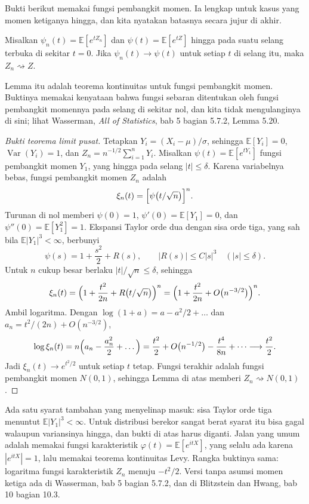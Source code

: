 Bukti berikut memakai fungsi pembangkit momen. Ia lengkap untuk kasus yang momen
ketiganya hingga, dan kita nyatakan batasnya secara jujur di akhir.

\begin{lemma}
Misalkan $\psi_n(t)=\mathbb{E}[e^{tZ_n}]$ dan $\psi(t)=\mathbb{E}[e^{tZ}]$ hingga
pada suatu selang terbuka di sekitar $t=0$. Jika $\psi_n(t)\to\psi(t)$ untuk
setiap $t$ di selang itu, maka $Z_n\rightsquigarrow Z$.
\end{lemma}

Lemma itu adalah teorema kontinuitas untuk fungsi pembangkit momen. Buktinya
memakai kenyataan bahwa fungsi sebaran ditentukan oleh fungsi pembangkit momennya
pada selang di sekitar nol, dan kita tidak mengulanginya di sini; lihat Wasserman,
\emph{All of Statistics}, bab 5 bagian 5.7.2, Lemma 5.20.

\begin{proof}[Bukti teorema limit pusat]
Tetapkan $Y_i=(X_i-\mu)/\sigma$, sehingga $\mathbb{E}[Y_i]=0$,
$\operatorname{Var}(Y_i)=1$, dan $Z_n=n^{-1/2}\sum_{i=1}^n Y_i$. Misalkan
$\psi(t)=\mathbb{E}[e^{tY_1}]$ fungsi pembangkit momen $Y_1$, yang hingga pada
selang $|t|\le\delta$. Karena variabelnya bebas, fungsi pembangkit momen $Z_n$
adalah
\[
\xi_n(t)=\Bigl[\psi\bigl(t/\sqrt n\bigr)\Bigr]^n .
\]
Turunan di nol memberi $\psi(0)=1$, $\psi'(0)=\mathbb{E}[Y_1]=0$, dan
$\psi''(0)=\mathbb{E}[Y_1^2]=1$. Ekspansi Taylor orde dua dengan sisa orde tiga,
yang sah bila $\mathbb{E}|Y_1|^3<\infty$, berbunyi
\[
\psi(s)=1+\frac{s^2}{2}+R(s),\qquad |R(s)|\le C|s|^3 \quad (|s|\le\delta).
\]
Untuk $n$ cukup besar berlaku $|t|/\sqrt n\le\delta$, sehingga
\[
\xi_n(t)=\Bigl(1+\frac{t^2}{2n}+R\bigl(t/\sqrt n\bigr)\Bigr)^n
=\Bigl(1+\frac{t^2}{2n}+O\bigl(n^{-3/2}\bigr)\Bigr)^n .
\]
Ambil logaritma. Dengan $\log(1+a)=a-a^2/2+\dots$ dan
$a_n=t^2/(2n)+O(n^{-3/2})$,
\[
\log\xi_n(t)=n\Bigl(a_n-\frac{a_n^2}{2}+\dots\Bigr)
=\frac{t^2}{2}+O\bigl(n^{-1/2}\bigr)-\frac{t^4}{8n}+\dots
\longrightarrow \frac{t^2}{2}.
\]
Jadi $\xi_n(t)\to e^{t^2/2}$ untuk setiap $t$ tetap. Fungsi terakhir adalah fungsi
pembangkit momen $N(0,1)$, sehingga Lemma di atas memberi
$Z_n\rightsquigarrow N(0,1)$.
\end{proof}

Ada satu syarat tambahan yang menyelinap masuk: sisa Taylor orde tiga menuntut
$\mathbb{E}|Y_1|^3<\infty$. Untuk distribusi berekor sangat berat syarat itu bisa
gagal walaupun variansinya hingga, dan bukti di atas harus diganti. Jalan yang
umum adalah memakai fungsi karakteristik $\varphi(t)=\mathbb{E}[e^{itX}]$, yang
selalu ada karena $|e^{itX}|=1$, lalu memakai teorema kontinuitas Levy. Rangka
buktinya sama: logaritma fungsi karakteristik $Z_n$ menuju $-t^2/2$. Versi tanpa
asumsi momen ketiga ada di Wasserman, bab 5 bagian 5.7.2, dan di Blitzstein dan
Hwang, bab 10 bagian 10.3.


